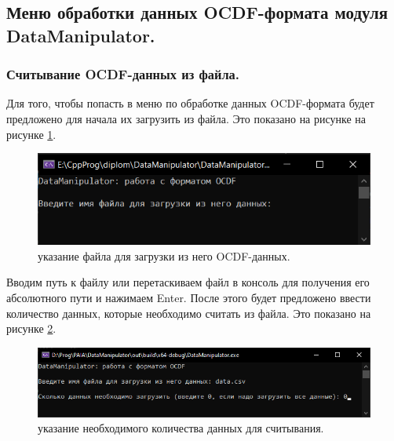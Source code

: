 \subsection{ \standartTitleFont
  Меню обработки данных OCDF-формата модуля DataManipulator.
} \label{subsec:targerDM}

\subsubsection{ \standartTitleFont
  Считывание OCDF-данных из файла.
} \label{subsubsec:ReadOCDF}

{\standartFont

  \par Для того, чтобы попасть в меню по обработке данных OCDF-формата будет предложено для начала их загрузить из файла. Это показано на рисунке на рисунке \ref{fig:readOCDFst1}.

  \begin{figure}[H]
    \centering
    \includegraphics[width=\textwidth]{images/forDataManipulator/readOCDFstage1.png}
    \caption{указание файла для загрузки из него OCDF-данных.}
    \label{fig:readOCDFst1}
  \end{figure}

  \par Вводим путь к файлу или перетаскиваем файл в консоль для получения его абсолютного пути и нажимаем Enter. После этого будет предложено ввести количество данных, которые необходимо считать из файла. Это показано на рисунке \ref{fig:readOCDFst2}.

  \begin{figure}[H]
    \centering
    \includegraphics[width=\textwidth]{images/forDataManipulator/readOCDFstage2.png}
    \caption{указание необходимого количества данных для считывания.}
    \label{fig:readOCDFst2}
  \end{figure}

}
